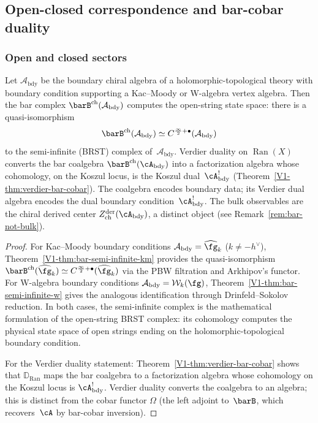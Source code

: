 \subsection{Open-closed correspondence and bar-cobar duality}

\subsubsection{Open and closed sectors}

\begin{theorem}
\label{thm:open-string-bar}
Let $\mathcal{A}_{\mathrm{bdy}}$ be the boundary chiral algebra of
a holomorphic-topological theory with boundary condition supporting
a Kac--Moody or W-algebra vertex algebra. Then the bar complex
$\barB^{\mathrm{ch}}(\mathcal{A}_{\mathrm{bdy}})$ computes the
open-string state space: there is a quasi-isomorphism
\[
\barB^{\mathrm{ch}}(\mathcal{A}_{\mathrm{bdy}})
\simeq
C^{\frac{\infty}{2}+\bullet}(\mathcal{A}_{\mathrm{bdy}})
\]
to the semi-infinite (BRST) complex of~$\mathcal{A}_{\mathrm{bdy}}$.
Verdier duality on $\operatorname{Ran}(X)$ converts the
bar coalgebra $\barB^{\mathrm{ch}}(\cA_{\mathrm{bdy}})$ into a
factorization algebra whose cohomology, on the Koszul locus, is the
Koszul dual~$\cA_{\mathrm{bdy}}^!$
\textup{(}Theorem~\textup{\ref*{V1-thm:verdier-bar-cobar})}.
The coalgebra encodes boundary data; its Verdier dual algebra
encodes the dual boundary condition~$\cA_{\mathrm{bdy}}^!$.
The bulk observables are the chiral derived center
$Z^{\mathrm{der}}_{\mathrm{ch}}(\cA_{\mathrm{bdy}})$, a distinct object
(see Remark~\ref{rem:bar-not-bulk}).
\end{theorem}

\begin{proof}
For Kac--Moody boundary conditions
$\mathcal{A}_{\mathrm{bdy}} = \widehat{\fg}_k$ ($k \neq -h^\vee$),
Theorem~\ref*{V1-thm:bar-semi-infinite-km} provides the quasi-isomorphism
$\barB^{\mathrm{ch}}(\widehat{\fg}_k) \simeq C^{\frac{\infty}{2}+\bullet}(\widehat{\fg}_k)$
via the PBW filtration and Arkhipov's functor.
For W-algebra boundary conditions
$\mathcal{A}_{\mathrm{bdy}} = \mathcal{W}_k(\fg)$,
Theorem~\ref*{V1-thm:bar-semi-infinite-w} gives the analogous
identification through Drinfeld--Sokolov reduction.
In both cases, the semi-infinite complex is the mathematical
formulation of the open-string BRST complex: its cohomology
computes the physical state space of open strings ending on
the holomorphic-topological boundary condition.

For the Verdier duality statement:
Theorem~\ref*{V1-thm:verdier-bar-cobar} shows that $\mathbb{D}_{\operatorname{Ran}}$
maps the bar coalgebra to a factorization algebra whose cohomology
on the Koszul locus is $\cA_{\mathrm{bdy}}^!$.
Verdier duality converts the coalgebra to an algebra; this is
distinct from the cobar functor $\Omega$ (the left adjoint to~$\barB$,
which recovers~$\cA$ by bar-cobar inversion).
\end{proof}

